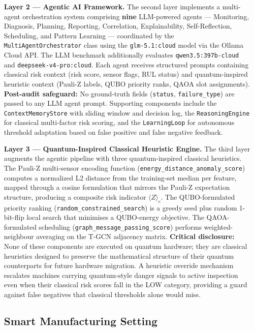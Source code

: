 \textbf{Layer 2 --- Agentic AI Framework.} The second layer implements a multi-agent orchestration system comprising \textbf{nine} LLM-powered agents --- Monitoring, Diagnosis, Planning, Reporting, Correlation, Explainability, Self-Reflection, Scheduling, and Pattern Learning --- coordinated by the \texttt{MultiAgentOrchestrator} class using the \texttt{glm-5.1:cloud} model via the Ollama Cloud API. The LLM benchmark additionally evaluates \texttt{qwen3.5:397b-cloud} and \texttt{deepseek-v4-pro:cloud}. Each agent receives structured prompts containing classical risk context (risk score, sensor flags, RUL status) and quantum-inspired heuristic context (Pauli-Z labels, QUBO priority ranks, QAOA slot assignments). \textbf{Post-audit safeguard:} No ground-truth fields (\texttt{status}, \texttt{failure\_type}) are passed to any LLM agent prompt. Supporting components include the \texttt{ContextMemoryStore} with sliding window and decision log, the \texttt{ReasoningEngine} for classical multi-factor risk scoring, and the \texttt{LearningLoop} for autonomous threshold adaptation based on false positive and false negative feedback.

\textbf{Layer 3 --- Quantum-Inspired Classical Heuristic Engine.} The third layer augments the agentic pipeline with three quantum-inspired classical heuristics. The Pauli-Z multi-sensor encoding function (\texttt{energy\_distance\_anomaly\_score}) computes a normalized L2 distance from the training-set median per feature, mapped through a cosine formulation that mirrors the Pauli-Z expectation structure, producing a composite risk indicator $\langle Z \rangle_c$. The QUBO-formulated priority ranking (\texttt{random\_constrained\_search}) is a greedy seed plus random 1-bit-flip local search that minimises a QUBO-energy objective. The QAOA-formulated scheduling (\texttt{graph\_message\_passing\_score}) performs weighted-neighbour averaging on the T-GCN adjacency matrix. \textbf{Critical disclosure:} None of these components are executed on quantum hardware; they are classical heuristics designed to preserve the mathematical structure of their quantum counterparts for future hardware migration. A heuristic override mechanism escalates machines carrying quantum-style danger signals to active inspection even when their classical risk scores fall in the LOW category, providing a guard against false negatives that classical thresholds alone would miss.

\subsection{Smart Manufacturing Setting}

